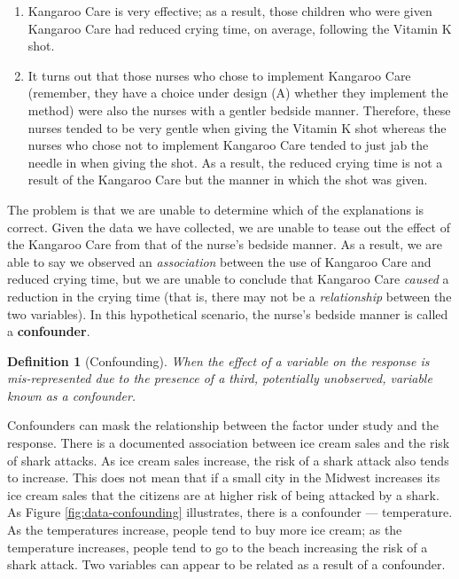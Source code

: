 \documentclass[
]{book}
\providecommand{\tightlist}{%
  \setlength{\itemsep}{0pt}\setlength{\parskip}{0pt}}
\theoremstyle{plain}
\theoremstyle{mydefn}
\newtheorem{definition}{Definition}[chapter]
\theoremstyle{myexmpl}
\theoremstyle{remark}
\begin{document}
\begin{enumerate}
\def\labelenumi{(\arabic{enumi})}
\tightlist
\item
  Kangaroo Care is very effective; as a result, those children who were given Kangaroo Care had reduced crying time, on average, following the Vitamin K shot.
\item
  It turns out that those nurses who chose to implement Kangaroo Care (remember, they have a choice under design (A) whether they implement the method) were also the nurses with a gentler bedside manner. Therefore, these nurses tended to be very gentle when giving the Vitamin K shot whereas the nurses who chose not to implement Kangaroo Care tended to just jab the needle in when giving the shot. As a result, the reduced crying time is not a result of the Kangaroo Care but the manner in which the shot was given.
\end{enumerate}

The problem is that we are unable to determine which of the explanations is correct. Given the data we have collected, we are unable to tease out the effect of the Kangaroo Care from that of the nurse's bedside manner. As a result, we are able to say we observed an \emph{association} between the use of Kangaroo Care and reduced crying time, but we are unable to conclude that Kangaroo Care \emph{caused} a reduction in the crying time (that is, there may not be a \emph{relationship} between the two variables). In this hypothetical scenario, the nurse's bedside manner is called a \textbf{confounder}.

\begin{definition}[Confounding]
\protect\hypertarget{def:defn-confounding}{}{\label{def:defn-confounding} {} }When the effect of a variable on the response is mis-represented due to the presence of a third, potentially unobserved, variable known as a confounder.
\end{definition}

Confounders can mask the relationship between the factor under study and the response. There is a documented association between ice cream sales and the risk of shark attacks. As ice cream sales increase, the risk of a shark attack also tends to increase. This does not mean that if a small city in the Midwest increases its ice cream sales that the citizens are at higher risk of being attacked by a shark. As Figure \ref{fig:data-confounding} illustrates, there is a confounder --- temperature. As the temperatures increase, people tend to buy more ice cream; as the temperature increases, people tend to go to the beach increasing the risk of a shark attack. Two variables can appear to be related as a result of a confounder.
\end{document}
